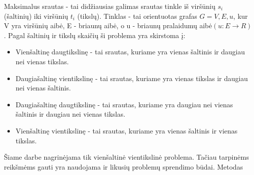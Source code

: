 Maksimalus srautas - tai didžiausias galimas srautas tinkle iš viršūnių $s_i$ (šaltinių) iki viršūnių $t_i$ (tikslų). Tinklas - tai orientuotas grafas $G= {V, E, u}$, kur V yra viršūnių aibė, E - briaunų aibė, o u - briaunų pralaidumų aibė$ ( u : E \rightarrow R )$. Pagal šaltinių ir tikslų skaičių ši problema yra skirstoma į:
\begin{itemize}
	\item Vienšaltinę daugtikslinę - tai srautas, kuriame yra vienas šaltinis ir daugiau nei vienas tikslas.
	\item Daugiašaltinę vientikslinę - tai srautas, kuriame yra vienas tikslas ir daugiau nei vienas šaltinis.
	\item Daugiašaltinę daugtikslinę - tai srautas, kuriame yra daugiau nei vienas šaltinis ir daugiau nei vienas tikslas.
	\item Vienšaltinę vientikslinę - tai srautas, kuriame yra vienas šaltinis ir vienas tikslas.
\end{itemize}

Šiame darbe nagrinėjama tik vienšaltinė vientikslinė problema. Tačiau tarpinėms reikšmėms gauti yra naudojama ir likusių problemų sprendimo būdai. Metodas